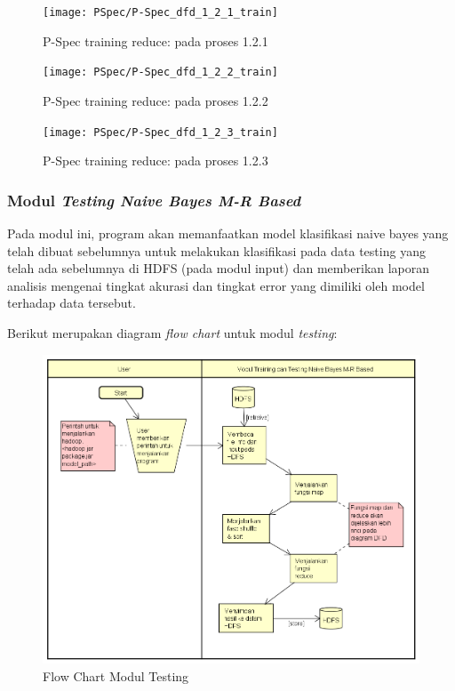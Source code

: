\begin{figure}[H]
	\centering
	\texttt{[image: PSpec/P-Spec\_dfd\_1\_2\_1\_train]}
	\caption[P-Spec training reduce: pada proses 1.2.1]{P-Spec training reduce: pada proses 1.2.1}
	\label{fig:P-Spec training reduce: pada proses 1.2.1}
\end{figure}

\begin{figure}[H]
	\centering
	\texttt{[image: PSpec/P-Spec\_dfd\_1\_2\_2\_train]}
	\caption[P-Spec training reduce: pada proses 1.2.2]{P-Spec training reduce: pada proses 1.2.2}
	\label{fig:P-Spec training reduce: pada proses 1.2.2}
\end{figure}

\begin{figure}[H]
	\centering
	\texttt{[image: PSpec/P-Spec\_dfd\_1\_2\_3\_train]}
	\caption[P-Spec training: pada proses 1.2.3]{P-Spec training reduce: pada proses 1.2.3}
	\label{fig:P-Spec training reduce: pada proses 1.2.3}
\end{figure}


\subsubsection{Modul \textit{Testing Naive Bayes M-R Based}}

Pada modul ini, program akan memanfaatkan model klasifikasi naive bayes yang telah dibuat sebelumnya untuk melakukan klasifikasi pada data testing yang telah ada sebelumnya di HDFS (pada modul input) dan memberikan laporan analisis mengenai tingkat akurasi dan tingkat error yang dimiliki oleh model terhadap data tersebut. 

Berikut merupakan diagram \textit{flow chart} untuk modul \textit{testing}:

\begin{figure}[H]
	\centering
	\includegraphics[scale=0.6]{Diagram/Flowchart_Training_Testing_MR}
	\caption[Flow Chart Modul Testing]{Flow Chart Modul Testing}
	\label{fig:Flow Chart Modul Testing}
\end{figure}

